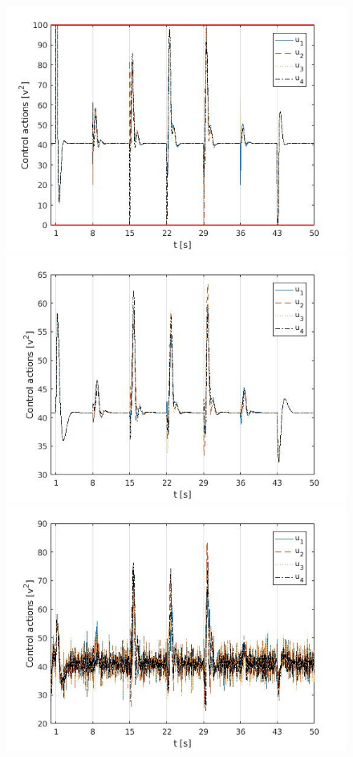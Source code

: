 \documentclass[]{article}
\begin{document}
\begin{figure}[H]
\begin{minipage}{.3\textwidth}
\includegraphics[width=\textwidth]{lqrinput.jpg}
\end{minipage}%
\begin{minipage}{.3\textwidth}
\includegraphics[width=\textwidth]{lqiinput.jpg}
\end{minipage}
\begin{minipage}{.3\textwidth}
\includegraphics[width=\textwidth]{kalinput.jpg}

\end{minipage}
\end{figure}
\end{document}
